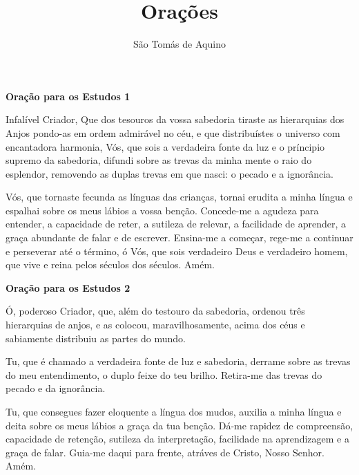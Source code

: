 \documentclass{article}
\begin{document}
\author{São Tomás de Aquino}
\title{Orações}

\maketitle

\textbf{Oração para os Estudos 1}\\

\vspace{5mm} %

Infalível Criador, Que dos tesouros da vossa sabedoria tiraste as hierarquias dos Anjos pondo-as em ordem admirável no céu, e que distribuístes o universo com encantadora harmonia, Vós, que sois a verdadeira fonte da luz e o príncipio supremo da sabedoria, difundi sobre as trevas da minha mente o raio do esplendor, removendo as duplas trevas em que nasci: o pecado e a ignorância.\par Vós, que tornaste fecunda as línguas das crianças, tornai erudita a minha língua e espalhai sobre os meus lábios a vossa benção. Concede-me a agudeza para entender, a capacidade de reter, a sutileza de relevar, a facilidade de aprender, a graça abundante de falar e de escrever. Ensina-me a começar, rege-me a continuar e perseverar até o término, ó Vós, que sois verdadeiro Deus e verdadeiro homem, que vive e reina pelos séculos dos séculos. Amém.\par

\vspace{5mm} %

\textbf{Oração para os Estudos 2}\\

\vspace{5mm} %

Ó, poderoso Criador, que, além do testouro da sabedoria, ordenou três hierarquias de anjos, e as colocou, maravilhosamente, acima dos céus e sabiamente distribuiu as partes do mundo.\par Tu, que é chamado a verdadeira fonte de luz e sabedoria, derrame sobre as trevas do meu entendimento, o duplo feixe do teu brilho. Retira-me das trevas do pecado e da ignorância.\par Tu, que consegues fazer eloquente a língua dos mudos, auxilia a minha língua e deita sobre os meus lábios a graça da tua benção. Dá-me rapidez de compreensão, capacidade de retenção, sutileza da interpretação, facilidade na aprendizagem e a graça de falar. Guia-me daqui para frente, atráves de Cristo, Nosso Senhor. Amém.\par
\end{document}
